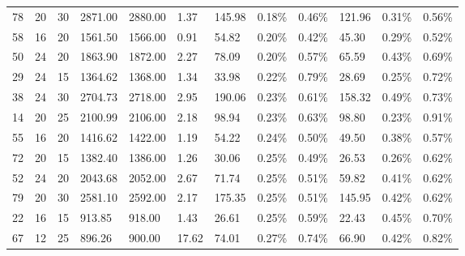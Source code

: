 \documentclass[../main]{subfiles}
\begin{document}
\begin{longtable}{l|ll|lll|lll|lll}
   78 & 20                         & 30                         & 2871.00                   & 2880.00  & 1.37                & 145.98 & 0.18\%  & 0.46\% & 121.96 & 0.31\%  & 0.56\% \\
   58 & 16                         & 20                         & 1561.50                   & 1566.00  & 0.91                & 54.82  & 0.20\%  & 0.42\% & 45.30  & 0.29\%  & 0.52\% \\
   50 & 24                         & 20                         & 1863.90                   & 1872.00  & 2.27                & 78.09  & 0.20\%  & 0.57\% & 65.59  & 0.43\%  & 0.69\% \\
   29 & 24                         & 15                         & 1364.62                   & 1368.00  & 1.34                & 33.98  & 0.22\%  & 0.79\% & 28.69  & 0.25\%  & 0.72\% \\
   38 & 24                         & 30                         & 2704.73                   & 2718.00  & 2.95                & 190.06 & 0.23\%  & 0.61\% & 158.32 & 0.49\%  & 0.73\% \\
   14 & 20                         & 25                         & 2100.99                   & 2106.00  & 2.18                & 98.94  & 0.23\%  & 0.63\% & 98.80  & 0.23\%  & 0.91\% \\
   55 & 16                         & 20                         & 1416.62                   & 1422.00  & 1.19                & 54.22  & 0.24\%  & 0.50\% & 49.50  & 0.38\%  & 0.57\% \\
   72 & 20                         & 15                         & 1382.40                   & 1386.00  & 1.26                & 30.06  & 0.25\%  & 0.49\% & 26.53  & 0.26\%  & 0.62\% \\
   52 & 24                         & 20                         & 2043.68                   & 2052.00  & 2.67                & 71.74  & 0.25\%  & 0.51\% & 59.82  & 0.41\%  & 0.62\% \\
   79 & 20                         & 30                         & 2581.10                   & 2592.00  & 2.17                & 175.35 & 0.25\%  & 0.51\% & 145.95 & 0.42\%  & 0.62\% \\
   22 & 16                         & 15                         & 913.85                    & 918.00   & 1.43                & 26.61  & 0.25\%  & 0.59\% & 22.43  & 0.45\%  & 0.70\% \\
   67 & 12                         & 25                         & 896.26                    & 900.00   & 17.62               & 74.01  & 0.27\%  & 0.74\% & 66.90  & 0.42\%  & 0.82\% \\

\end{longtable}
\end{document}
